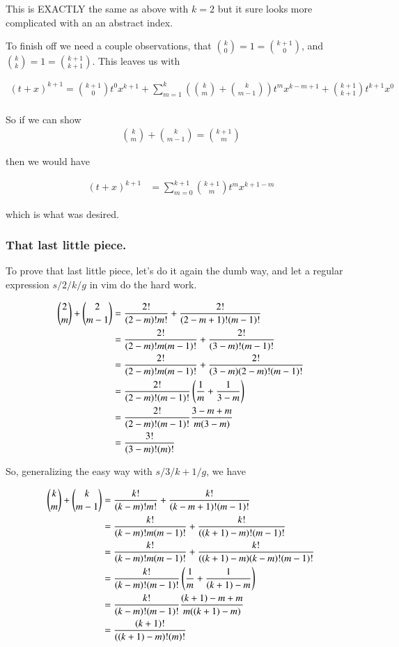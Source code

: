This is EXACTLY the same as above with $k=2$ but it sure looks more complicated with an an abstract index.

To finish off we need a couple observations, that 
$\binom{k}{0} = 1 = \binom{k+1}{0}$, and $\binom{k}{k} = 1 = \binom{k+1}{k+1}$.  This leaves us with

\begin{align*}
(t + x)^{k+1}
= \binom{k+1}{0} t^{0} x^{k + 1} 
+ \sum_{m=1}^{k} \left( \binom{k}{m} + \binom{k}{m-1} \right) t^{m} x^{k - m + 1} 
+ \binom{k + 1}{k + 1} t^{k + 1} x^{0} \\
\end{align*}

So if we can show
\begin{align*}
\binom{k}{m} + \binom{k}{m-1} = \binom{k+1}{m}
\end{align*}

then we would have

\begin{align*}
(t + x)^{k+1}
&= \sum_{m=0}^{k+1} \binom{k+1}{m} t^{m} x^{k + 1 - m} 
\end{align*}

which is what was desired.

\subsubsection{That last little piece. }

To prove that last little piece, let's do it again the dumb way, and let a regular expression $s/2/k/g$ in vim do the hard work.

\begin{align*}
\binom{2}{m} + \binom{2}{m-1} 
&=
\frac{2!}{(2-m)!m!}
+ \frac{2!}{(2-m + 1)!(m-1)!} \\
&=
\frac{2!}{(2-m)!m(m-1)!}
+ \frac{2!}{(3-m)!(m-1)!} \\
&=
\frac{2!}{(2-m)!m(m-1)!}
+ \frac{2!}{(3-m)(2-m)!(m-1)!} \\
&=
\frac{2!}{(2-m)!(m-1)!} \left( \frac{1}{m} + \frac{1}{3-m}\right) \\
&=
\frac{2!}{(2-m)!(m-1)!} \frac{3 -m + m }{m(3-m)} \\
&=
\frac{3!}{(3-m)!(m)!} \\
\end{align*}

So, generalizing the easy way with $s/3/k+1/g$, we have 

\begin{align*}
\binom{k}{m} + \binom{k}{m-1} 
&=
\frac{k!}{(k-m)!m!}
+ \frac{k!}{(k-m + 1)!(m-1)!} \\
&=
\frac{k!}{(k-m)!m(m-1)!}
+ \frac{k!}{((k+1)-m)!(m-1)!} \\
&=
\frac{k!}{(k-m)!m(m-1)!}
+ \frac{k!}{((k+1)-m)(k-m)!(m-1)!} \\
&=
\frac{k!}{(k-m)!(m-1)!} \left( \frac{1}{m} + \frac{1}{(k+1)-m}\right) \\
&=
\frac{k!}{(k-m)!(m-1)!} \frac{(k+1) -m + m }{m((k+1)-m)} \\
&=
\frac{(k+1)!}{((k+1)-m)!(m)!} \\
\end{align*}

